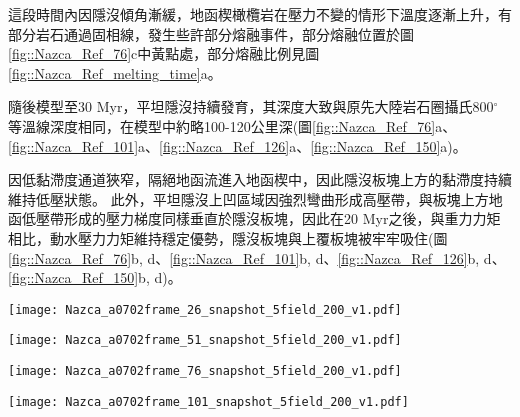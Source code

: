 這段時間內因隱沒傾角漸緩，地函楔橄欖岩在壓力不變的情形下溫度逐漸上升，有部分岩石通過固相線，發生些許部分熔融事件，部分熔融位置於圖\ref{fig::Nazca_Ref_76}c中黃點處，部分熔融比例見圖\ref{fig::Nazca_Ref_melting_time}a。

隨後模型至30 Myr，平坦隱沒持續發育，其深度大致與原先大陸岩石圈攝氏800$^{\circ}$等溫線深度相同，在模型中約略100-120公里深(圖\ref{fig::Nazca_Ref_76}a、\ref{fig::Nazca_Ref_101}a、\ref{fig::Nazca_Ref_126}a、\ref{fig::Nazca_Ref_150}a)。

因低黏滯度通道狹窄，隔絕地函流進入地函楔中，因此隱沒板塊上方的黏滯度持續維持低壓狀態。
此外，平坦隱沒上凹區域因強烈彎曲形成高壓帶，與板塊上方地函低壓帶形成的壓力梯度同樣垂直於隱沒板塊，因此在20 Myr之後，與重力力矩相比，動水壓力力矩維持穩定優勢，隱沒板塊與上覆板塊被牢牢吸住(圖\ref{fig::Nazca_Ref_76}b, d、\ref{fig::Nazca_Ref_101}b, d、\ref{fig::Nazca_Ref_126}b, d、\ref{fig::Nazca_Ref_150}b, d)。


\begin{figure*}[htp]
    \centering
    \texttt{[image: Nazca\_a0702frame\_26\_snapshot\_5field\_200\_v1.pdf]}
    \caption[智利參考模型於5 Myr時之結果。]{智利參考模型於5 Myr時之結果。其中(a)為岩相剖面，圖中實線為攝氏200-1200度等溫線，粉紅虛線為攝氏1330度等溫線。(b)為黏滯度剖面，(c)為密度剖面，黃點標示部分熔融位置，(d)為動水壓力剖面，(e)為應變率第二不變量。圖(b)-(e)中的灰色實線繪攝氏400$^{\circ}$、600$^{\circ}$與800$^{\circ}$等溫線。}
    \label{fig::Nazca_Ref_26}
\end{figure*}

\begin{figure*}[htp]
    \centering
    \texttt{[image: Nazca\_a0702frame\_51\_snapshot\_5field\_200\_v1.pdf]}
    \caption[智利參考模型於10 Myr時之結果。]{智利參考模型於10 Myr時之結果。}
    \label{fig::Nazca_Ref_51}
\end{figure*}

\begin{figure*}[htp]
    \centering
    \texttt{[image: Nazca\_a0702frame\_76\_snapshot\_5field\_200\_v1.pdf]}
    \caption[智利參考模型於15 Myr時之結果。]{智利參考模型於15 Myr時之結果。}
    \label{fig::Nazca_Ref_76}
\end{figure*}

\begin{figure*}[htp]
    \centering
    \texttt{[image: Nazca\_a0702frame\_101\_snapshot\_5field\_200\_v1.pdf]}
    \caption[智利參考模型於20 Myr時之結果。]{智利參考模型於20 Myr時之結果。}
    \label{fig::Nazca_Ref_101}
\end{figure*}

